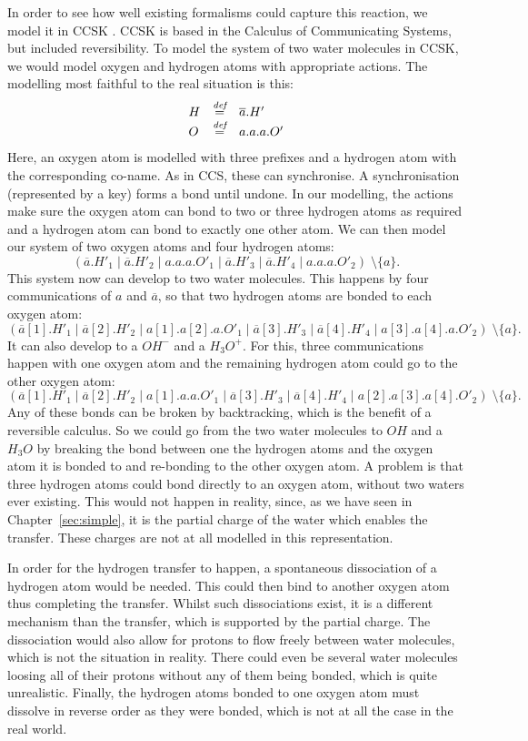 \documentclass[runningheads]{llncs}
\newcommand{\paral}{\; \vert \;}
\newcommand{\bydef}{\stackrel{\emph{def}}{=}}
\begin{document}
In order to see how well existing formalisms could capture this reaction, we model it in CCSK \cite{Irek2007}. CCSK is based in the Calculus of Communicating Systems, but included reversibility. To model the system of two water molecules in CCSK, we would model oxygen and hydrogen atoms with appropriate actions. The modelling most faithful to the real situation is this:
%
$$\begin{array}{lll}
H & \bydef & \overline{a}.H'\\
O & \bydef & a.a.a.O'
\end{array}$$
%
Here, an oxygen atom is modelled with three prefixes and a hydrogen atom with the corresponding co-name. As in CCS, these can synchronise. A synchronisation (represented by a key) forms a bond until undone. In our modelling, the actions make sure the oxygen atom can bond to two or three hydrogen atoms as required and a hydrogen atom can bond to exactly one other atom. We can then model our system of two oxygen atoms and four hydrogen atoms:
%
$$( \overline{a}.H'_1 \paral \overline{a}.H'_2 \paral a.a.a.O'_1 \paral \overline{a}.H'_3 \paral \overline{a}.H'_4 \paral a.a.a.O'_2) 
\; \setminus\{a\}.$$
%
This system now can develop to two water molecules. This happens by four communications of $a$ and $\overline{a}$, so that two hydrogen atoms are bonded to each oxygen atom:
%
$$( \overline{a}[1].H'_1 \paral \overline{a}[2].H'_2 \paral a[1].a[2].a.O'_1 \paral \overline{a}[3].H'_3 \paral \overline{a}[4].H'_4 \paral a[3].a[4].a.O'_2) 
\; \setminus\{a\}.$$
%
It can also develop to a $OH^-$ and a $H_3O^+$. For this, three communications happen with one oxygen atom and the remaining hydrogen atom could go to the other oxygen atom:
%
$$( \overline{a}[1].H'_1 \paral \overline{a}[2].H'_2 \paral a[1].a.a.O'_1 \paral \overline{a}[3].H'_3 \paral \overline{a}[4].H'_4 \paral a[2].a[3].a[4].O'_2) 
\; \setminus\{a\}.$$
%
Any of these bonds can be broken by backtracking, which is the benefit of a reversible calculus. So we could go from the two water molecules to $OH$ and a $H_3O$ by breaking the bond between one the hydrogen atoms and the oxygen atom it is bonded to and re-bonding to the other oxygen atom. A problem is that three hydrogen atoms could bond directly to an oxygen atom, without two waters ever existing. This would not happen in reality, since, as we have seen in Chapter~\ref{sec:simple}, it is the partial charge of the water which enables the transfer. These charges are not at all modelled in this representation.

In order for the hydrogen transfer to happen, a spontaneous dissociation of a hydrogen atom would be needed. This could then bind to another oxygen atom thus completing the transfer. Whilst such dissociations exist, it is a different mechanism than the transfer, which is supported by the partial charge. The dissociation would also allow for protons to flow freely between water molecules, which is not the situation in reality. There could even be several water molecules loosing all of their protons without any of them being bonded, which is quite unrealistic. Finally, the hydrogen atoms bonded to one oxygen atom must dissolve in reverse order as they were bonded, which is not at all the case in the real world.
\end{document}
